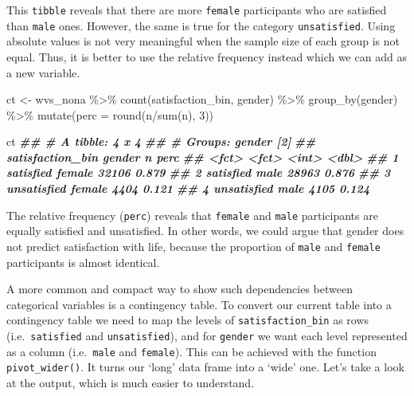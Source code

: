 \documentclass[
]{book}
\newenvironment{Shaded}{\begin{snugshade}}{\end{snugshade}}
\newcommand{\AttributeTok}[1]{\textcolor[rgb]{0.77,0.63,0.00}{#1}}
\newcommand{\DecValTok}[1]{\textcolor[rgb]{0.00,0.00,0.81}{#1}}
\newcommand{\DocumentationTok}[1]{\textcolor[rgb]{0.56,0.35,0.01}{\textbf{\textit{#1}}}}
\newcommand{\FunctionTok}[1]{\textcolor[rgb]{0.00,0.00,0.00}{#1}}
\newcommand{\NormalTok}[1]{#1}
\newcommand{\OtherTok}[1]{\textcolor[rgb]{0.56,0.35,0.01}{#1}}
\newcommand{\SpecialCharTok}[1]{\textcolor[rgb]{0.00,0.00,0.00}{#1}}
\begin{document}
This \texttt{tibble} reveals that there are more \texttt{female} participants who are satisfied than \texttt{male} ones. However, the same is true for the category \texttt{unsatisfied}. Using absolute values is not very meaningful when the sample size of each group is not equal. Thus, it is better to use the relative frequency instead which we can add as a new variable.

\begin{Shaded}
\begin{Highlighting}[]
\NormalTok{ct }\OtherTok{\textless{}{-}}\NormalTok{ wvs\_nona }\SpecialCharTok{\%\textgreater{}\%}
  \FunctionTok{count}\NormalTok{(satisfaction\_bin, gender) }\SpecialCharTok{\%\textgreater{}\%}
  \FunctionTok{group\_by}\NormalTok{(gender) }\SpecialCharTok{\%\textgreater{}\%}
  \FunctionTok{mutate}\NormalTok{(}\AttributeTok{perc =} \FunctionTok{round}\NormalTok{(n}\SpecialCharTok{/}\FunctionTok{sum}\NormalTok{(n), }\DecValTok{3}\NormalTok{))}

\NormalTok{ct}
\DocumentationTok{\#\# \# A tibble: 4 x 4}
\DocumentationTok{\#\# \# Groups:   gender [2]}
\DocumentationTok{\#\#   satisfaction\_bin gender     n  perc}
\DocumentationTok{\#\#   \textless{}fct\textgreater{}            \textless{}fct\textgreater{}  \textless{}int\textgreater{} \textless{}dbl\textgreater{}}
\DocumentationTok{\#\# 1 satisfied        female 32106 0.879}
\DocumentationTok{\#\# 2 satisfied        male   28963 0.876}
\DocumentationTok{\#\# 3 unsatisfied      female  4404 0.121}
\DocumentationTok{\#\# 4 unsatisfied      male    4105 0.124}
\end{Highlighting}
\end{Shaded}

The relative frequency (\texttt{perc}) reveals that \texttt{female} and \texttt{male} participants are equally satisfied and unsatisfied. In other words, we could argue that gender does not predict satisfaction with life, because the proportion of \texttt{male} and \texttt{female} participants is almost identical.

A more common and compact way to show such dependencies between categorical variables is a contingency table. To convert our current table into a contingency table we need to map the levels of \texttt{satisfaction\_bin} as rows (i.e.~\texttt{satisfied} and \texttt{unsatisfied}), and for \texttt{gender} we want each level represented as a column (i.e.~\texttt{male} and \texttt{female}). This can be achieved with the function \texttt{pivot\_wider()}. It turns our `long' data frame into a `wide' one. Let's take a look at the output, which is much easier to understand.
\end{document}
